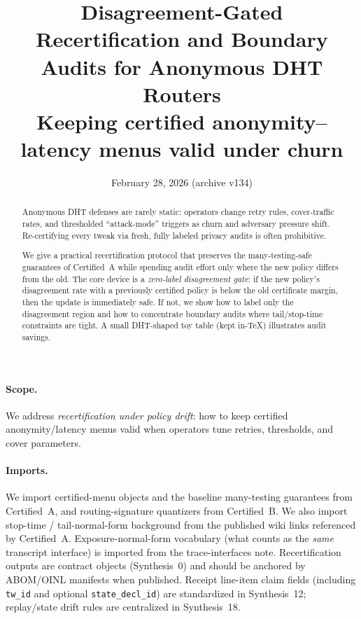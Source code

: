\documentclass[11pt]{article}
\title{\textbf{Disagreement-Gated Recertification and Boundary Audits for Anonymous DHT Routers}\\
\large Keeping certified anonymity--latency menus valid under churn}
\author{}
\date{February 28, 2026 (archive v134)}
\begin{document}
\maketitle

\begin{abstract}
Anonymous DHT defenses are rarely static: operators change retry rules, cover-traffic rates, and thresholded ``attack-mode'' triggers as churn and adversary pressure shift.
Re-certifying every tweak via fresh, fully labeled privacy audits is often prohibitive.

We give a practical recertification protocol that preserves the many-testing-safe guarantees of Certified~A while spending audit effort only where the new policy differs from the old.
The core device is a \emph{zero-label disagreement gate}: if the new policy's disagreement rate with a previously certified policy is below the old certificate margin, then the update is immediately safe.
If not, we show how to label only the disagreement region and how to concentrate boundary audits where tail/stop-time constraints are tight.
A small DHT-shaped toy table (kept in-\TeX) illustrates audit savings.
\end{abstract}


\paragraph{Scope.}
We address \emph{recertification under policy drift}: how to keep certified anonymity/latency menus valid when operators tune retries, thresholds, and cover parameters.

\paragraph{Imports.}
We import certified-menu objects and the baseline many-testing guarantees from Certified~A, and routing-signature quantizers from Certified~B.\cite{series:menus,series:sigcomp}
We also import stop-time / tail-normal-form background from the published wiki links referenced by Certified~A.
Exposure-normal-form vocabulary (what counts as the \emph{same} transcript interface) is imported from the trace-interfaces note.\cite{series:traceifaces}
Recertification outputs are contract objects (Synthesis~0) and should be anchored by ABOM/OINL manifests when published.\cite{series:contractobjects,series:abomoinl}
Receipt line-item claim fields (including \texttt{tw\_id} and optional \texttt{state\_decl\_id}) are standardized in Synthesis~12; replay/state drift rules are centralized in Synthesis~18.\cite{series:receiptitems,series:planstateequiv}
\end{document}
